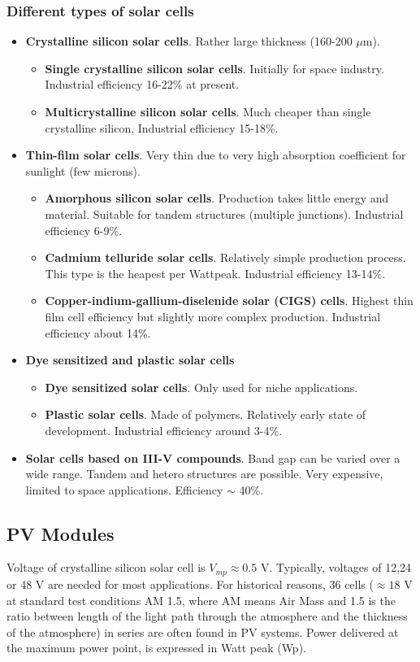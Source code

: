 \documentclass[a4paper,10pt]{article}
\begin{document}
\subsubsection{Different types of solar cells}
\begin{itemize}
 \item \textbf{Crystalline silicon solar cells}. Rather large thickness (160-200 $\mu$m).
 \begin{itemize}
  \item \textbf{Single crystalline silicon solar cells}. Initially for space industry. Industrial efficiency 16-22\% at present.
  \item \textbf{Multicrystalline silicon solar cells}. Much cheaper than single crystalline silicon, Industrial efficiency 15-18\%.
 \end{itemize}
 \item \textbf{Thin-film solar cells}. Very thin due to very high absorption coefficient for sunlight (few microns).
 \begin{itemize}
  \item \textbf{Amorphous silicon solar cells}. Production takes little energy and material. Suitable for tandem structures (multiple junctions). Industrial efficiency 6-9\%.
  \item \textbf{Cadmium telluride solar cells}. Relatively simple production process. This type is the heapest per Wattpeak. Industrial efficiency 13-14\%. 
  \item \textbf{Copper-indium-gallium-diselenide solar (CIGS) cells}. Highest thin film cell efficiency but slightly more complex production. Industrial efficiency about 14\%.
 \end{itemize}
 \item \textbf{Dye sensitized and plastic solar cells} 
 \begin{itemize}
  \item \textbf{Dye sensitized solar cells}. Only used for niche applications. 
  \item \textbf{Plastic solar cells}. Made of polymers. Relatively early state of development. Industrial efficiency around 3-4\%.
 \end{itemize}
 \item \textbf{Solar cells based on III-V compounds}. Band gap can be varied over a wide range. Tandem and hetero structures are possible. Very expensive, limited to space applications. Efficiency $\sim$ 40\%.
\end{itemize}

\subsection{PV Modules}
Voltage of crystalline silicon solar cell is $V_{mp} \approx 0.5$ V. Typically, voltages of 12,24 or 48 V are needed for most applications. For historical reasons, 36 cells ($\approx 18$ V at standard test conditions AM 1.5, where AM means Air Mass and 1.5 is the ratio between length of the light path through the atmosphere and the thickness of the atmosphere) in series are often found in PV systems. Power delivered at the maximum power point, is expressed in Watt peak (Wp). \bigskip
\end{document}
